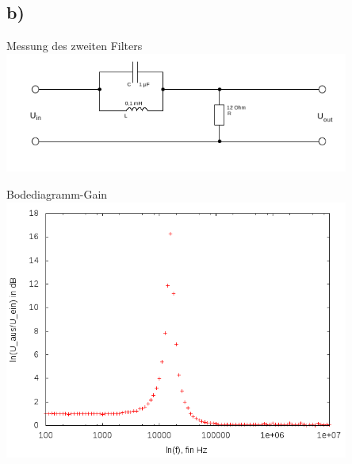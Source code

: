 \documentclass[compress,11pt]{beamer}
\begin{document}
\subsection{b)}
\begin{frame}
\begin{block}{Messung des zweiten Filters}
\includegraphics[width=0.85\textwidth]{../daten/Messdaten/plots/schalt_4b}
\end{block}
\end{frame}
\begin{frame}
\begin{block}{Bodediagramm-Gain}
\includegraphics[width=0.85\textwidth]{../daten/Messdaten/plots/Aufgabe4bschaltung2}

\end{block}
\end{frame}
\end{document}
